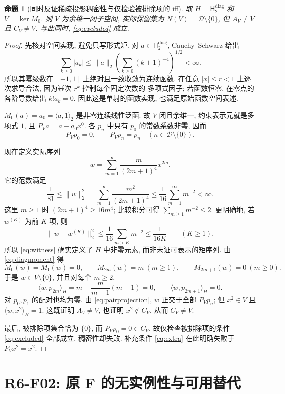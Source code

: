 \documentclass[UTF8,11pt]{ctexart}
\newtheorem{proposition}[theorem]{命题}
\theoremstyle{definition}
\newcommand{\ip}[2]{\langle #1,#2\rangle_H}
\newcommand{\D}{\mathcal D}
\newcommand{\Hd}[1]{\mathsf H_{#1}^{\mathrm{diag}}}
\begin{document}
\begin{proposition}[同时反证稀疏投影稠密性与仅检验被排除项的 iff]\label{prop:beta2}
取 $H=\Hd2$ 和 $V=\ker M_0$. 则 $V$ 为余维一闭子空间,
实际保留集为 $N(V)=\D\setminus\{0\}$, 但 $A_V\ne V$ 且 $C_V\ne V$.
与此同时, \eqref{eq:excluded} 成立.
\end{proposition}
\begin{proof}
先核对空间实现, 避免只写形式矩.
对 $a\in\Hd2$, Cauchy--Schwarz 给出
\[
 \sum_{k\geq0}|a_k|\leq\|a\|_2
 \left(\sum_{k\geq0}(k+1)^{-4}\right)^{1/2}<\infty.
\]
所以其幂级数在 $[-1,1]$ 上绝对且一致收敛为连续函数.
在任意 $|x|\leq r<1$ 上逐次求导合法, 因为幂次 $r^k$ 控制每个固定次数的
多项式因子; 若函数恒零, 在零点的各阶导数给出 $k!a_k=0$.
因此这是单射的函数实现, 也满足原始函数空间表述.

$M_0(a)=a_0=\langle a,1\rangle_2$ 是非零连续线性泛函.
故 $V$ 闭且余维一, 约束表示元就是多项式 $1$,
且 $P_Va=a-a_0x^0$.
各 $p_n$ 中只有 $p_0$ 的常数系数非零, 因而
\begin{equation}\label{eq:beta2projection}
 P_Vp_0=0,\qquad P_Vp_n=p_n\quad(n\in\D\setminus\{0\}).
\end{equation}

现在定义实际序列
\begin{equation}\label{eq:witness}
 w=\sum_{m=1}^{\infty}\frac{m}{(2m+1)^4}x^{2m}.
\end{equation}
它的范数满足
\[
 \frac1{81}\leq\|w\|_2^2=\sum_{m=1}^{\infty}\frac{m^2}{(2m+1)^4}
 \leq\frac1{16}\sum_{m=1}^{\infty}m^{-2}<\infty.
\]
这里 $m\geq1$ 时 $(2m+1)^4\geq16m^4$; 比较积分可得
$\sum_{m\geq1}m^{-2}\leq2$.
更明确地, 若 $w^{(K)}$ 为前 $K$ 项, 则
\[
 \|w-w^{(K)}\|_2^2\leq\frac1{16}\sum_{m>K}m^{-2}\leq\frac1{16K}
 \qquad(K\geq1).
\]
所以 \eqref{eq:witness} 确实定义了 $H$ 中非零元素, 而非未证可表示的矩序列.
由 \eqref{eq:diagmoment} 得
\[
 M_0(w)=M_1(w)=0,\qquad M_{2m}(w)=m\ (m\geq1),\qquad
 M_{2m+1}(w)=0\ (m\geq0).
\]
于是 $w\in V\setminus\{0\}$, 并且对每个 $m\geq2$,
\[
 \ip{w}{p_{2m}}=m-\frac{m}{m-1}(m-1)=0,\qquad
 \ip{w}{p_{2m+1}}=0.
\]
对 $p_0,p_1$ 的配对也均为零.
由 \eqref{eq:pairprojection}, $w$ 正交于全部 $P_Vp_n$;
但 $x^2\in V$ 且 $\ip{w}{x^2}=1$.
这既证明 $A_V\ne V$, 也证明 $x^2\notin C_V$, 从而 $C_V\ne V$.

最后, 被排除项集合恰为 $\{0\}$, 而 $P_Vp_0=0\in C_V$.
故仅检查被排除项的条件 \eqref{eq:excluded} 全部成立, 稠密性却失败.
补充条件 \eqref{eq:extra} 在此明确失败于 $P_Vx^2=x^2$.
\end{proof}

\section{R6-F02: 原 F 的无实例性与可用替代}\label{sec:firstmoment}
\end{document}
